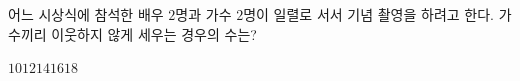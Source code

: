 \hspace*{2mm}\begin{minipage}[t]{\dimexpr\linewidth-2mm\relax}\vspace{0pt}
어느 시상식에 참석한 배우 $2$명과 가수 $2$명이 일렬로 서서 기념 촬영을 하려고 한다. 가수끼리 이웃하지 않게 세우는 경우의 수는?
\begin{choices32}{$10$}{$12$}{$14$}{$16$}{$18$}\end{choices32}\end{minipage}
